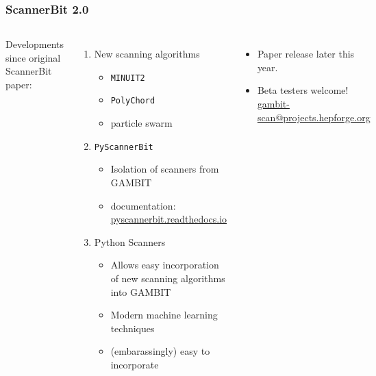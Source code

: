 \documentclass[aspectratio=169]{beamer}
\begin{document}
\begin{frame}[fragile]
    \frametitle{ScannerBit 2.0}
    \begin{columns}
        Developments since original ScannerBit paper:
        \begin{enumerate}
            \item New scanning algorithms
                \begin{itemize}
                    \item \texttt{MINUIT2}
                    \item \texttt{PolyChord}
                    \item particle swarm
                \end{itemize}
            \item \texttt{PyScannerBit}
                \begin{itemize}
                    \item Isolation of scanners from GAMBIT
                    \item documentation: \href{https://pyscannerbit.readthedocs.io}{pyscannerbit.readthedocs.io}
                \end{itemize}
            \item Python Scanners
                \begin{itemize}
                    \item Allows easy incorporation of new scanning algorithms into GAMBIT
                    \item Modern machine learning techniques
                    \item (embarassingly) easy to incorporate
                \end{itemize}
        \end{enumerate}
        \begin{itemize}
            \item Paper release later this year.
            \item Beta testers welcome! \tiny{\href{mailto:gambit-scan@projects.hepforge.org}{gambit-scan@projects.hepforge.org}}
        \end{itemize}
\begin{lstlisting}[language=Python]
"""scipy.optimize scanner."""
import scanner_plugin as splug
import scipy.optimize
import numpy as np


class Minimize(splug.scanner):
    __version__ = scipy_version


\end{lstlisting}
\end{columns}
\end{frame}
\end{document}

